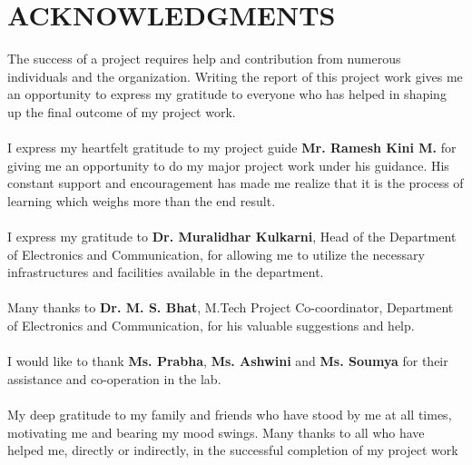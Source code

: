 \section*{\centering ACKNOWLEDGMENTS}
The success of a project requires help and contribution from numerous individuals and 
the organization. Writing the report of this project work gives me an opportunity to 
express my gratitude to everyone who has helped in shaping up the final outcome of my 
project work.
 \paragraph{} I express my heartfelt gratitude to my project guide {\bf Mr. Ramesh Kini M.} for 
giving me an opportunity to do my major project work under his guidance. His constant 
support and encouragement has made me realize that it is the process of learning which 
weighs more than the end result.
\paragraph{} I express my gratitude to {\bf Dr. Muralidhar Kulkarni}, Head of the Department of 
Electronics and Communication, for allowing me to utilize the necessary infrastructures and 
facilities available in the department.
\paragraph{} Many thanks to {\bf Dr. M. S. Bhat}, M.Tech Project Co-coordinator, Department of 
Electronics and Communication, for his valuable suggestions and help.
\paragraph{} I would like to thank {\bf Ms. Prabha}, {\bf Ms. Ashwini} and {\bf Ms. Soumya} for 
their assistance and co-operation in the lab.
\paragraph{} My deep gratitude to my family and friends who have stood by me at all times, motivating 
me and bearing my mood swings. Many thanks to all who have helped me, directly or indirectly, in 
the successful completion of my project work
